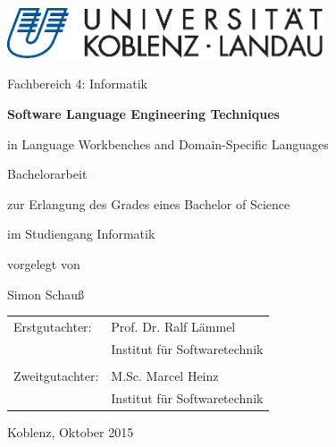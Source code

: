 \begin{titlepage}
	\begin{center}
		\includegraphics[width=0.7\textwidth]{university-logo.eps}

		Fachbereich 4: Informatik

		\vspace*{4em}
		\Huge
		\textbf{Software Language Engineering Techniques}

		\vspace{0.5em}
		\LARGE
		in Language Workbenches and Domain-Specific Languages

		\vspace{2em}
		\Large
		Bachelorarbeit

		\vspace{0.5em}
		\normalsize
		zur Erlangung des Grades eines Bachelor of Science

		im Studiengang Informatik
	
		\vspace{1em}
		\small
		vorgelegt von

		\large
		Simon Schauß
	\end{center}

	\vspace{8em}
	\normalsize
	\noindent
	\begin{tabularx}{\textwidth}{@{} l l}
		Erstgutachter:  & Prof. Dr. Ralf Lämmel		\\
				& Institut für Softwaretechnik 	\\
				&				\\
		Zweitgutachter: & M.Sc. Marcel Heinz		\\
				& Institut für Softwaretechnik
	\end{tabularx}	

	\vspace{4em}
	\noindent
	Koblenz, Oktober 2015
\end{titlepage}
